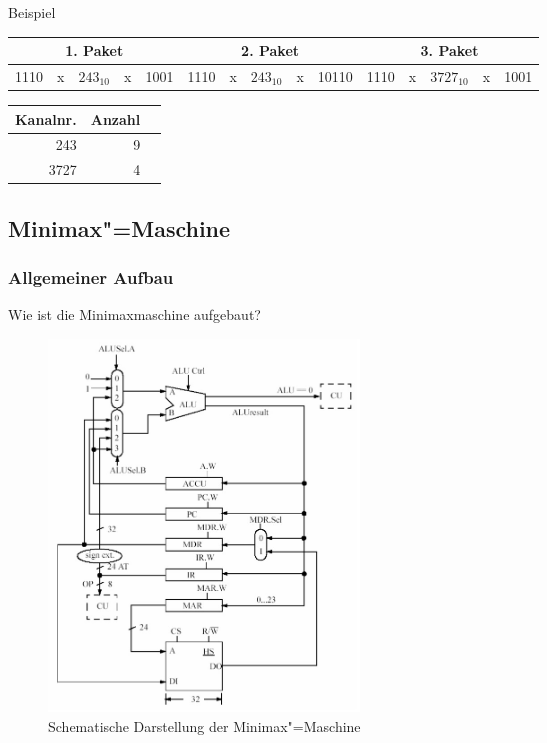 \documentclass{beamer}
\begin{document}
\begin{frame}{Beispiel}

\begin{center}
    \tiny
    \begin{tabular}{|c|c|c|c|c|c|c|c|c|c|c|c|c|c|c|}
        \multicolumn{5}{c|}{1. Paket} & \multicolumn{5}{c|}{2. Paket} & \multicolumn{5}{c}{3. Paket}\\ \hline
        1110 & x & $243_{10}$ & x & 1001 & 1110 & x & $243_{10}$ & x & 10110 & 1110 & x & $3727_{10}$ & x & 1001 \\ \hline
    \end{tabular}
\end{center}

\begin{center}
    \footnotesize
    \begin{tabular}{|r|r|l|}
        \hline
        Kanalnr. & Anzahl \\
        \hline
        \hline
        243 & 9 \\
        \hline
        3727 & 4 \\
        \hline
    \end{tabular}
\end{center}

\end{frame}



\subsection{Minimax"=Maschine}

\subsubsection{Allgemeiner Aufbau}



\begin{frame}{Wie ist die Minimaxmaschine aufgebaut?}

\begin{figure}
    \includegraphics[width=0.4\textwidth]{res/minimax.png} 
    \caption{Schematische Darstellung der Minimax"=Maschine}
\end{figure}

\end{frame}
\end{document}
